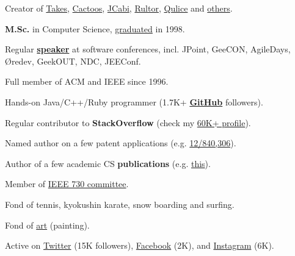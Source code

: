 \documentclass[12pt]{article}
\begin{document}
Creator of \href{http://www.takes.org}{Takes},
  \href{http://www.cactoos.org}{Cactoos},
  \href{http://www.jcabi.com}{JCabi},
  \href{http://www.rultor.com}{Rultor},
  \href{http://www.qulice.com}{Qulice} and
  \href{http://www.yegor256.com/pets.html}{others}.

\textbf{M.Sc.} in Computer Science,
  \href{https://en.wikipedia.org/wiki/Oles_Honchar_Dnipro_National_University}{graduated} in 1998.

Regular \textbf{\href{http://www.yegor256.com/talks.html}{speaker}}
  at software conferences, incl. JPoint, GeeCON, AgileDays, {\O}redev, GeekOUT, NDC, JEEConf.

Full member of ACM and IEEE since 1996.

Hands-on Java/C++/Ruby programmer
  (1.7K+ \textbf{\href{https://github.com/yegor256}{GitHub}} followers).

Regular contributor to \textbf{StackOverflow}
  (check my \href{https://stackexchange.com/users/63162/yegor256}{60K+ profile}).

Named author on a few patent applications
  (e.g. \href{https://www.google.com/patents/US20120023476}{12/840,306}).

Author of a few academic CS \textbf{publications}
  (e.g. \href{link.springer.com/chapter/10.1007/978-3-642-02152-7_6}{this}).

Member of \href{http://standards.ieee.org/develop/wg/730.html}{IEEE 730 committee}.

Fond of tennis, kyokushin karate, snow boarding and surfing.

Fond of \href{http://www.yegor256.com/paintings.html}{art} (painting).

Active on
  \href{https://twitter.com/intent/follow?screen_name=yegor256}{Twitter} (15K followers),
  \href{https://www.facebook.com/yegor256}{Facebook} (2K),
  and \href{https://instagram.com/yegor256}{Instagram} (6K).
\end{document}
